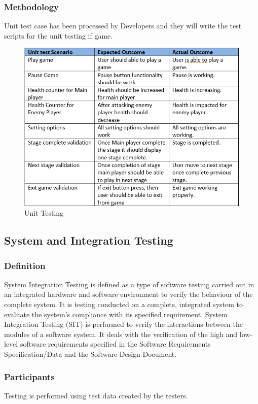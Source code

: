 \documentclass{article}
\begin{document}
\subsubsection{Methodology}
Unit test case has been processed by Developers and they will write the test scripts for the unit testing if game.\cite{UT}
\begin{figure}[h!]
    \centering
    \includegraphics[scale=0.6]{./images/unittesting.PNG}
    \caption{Unit Testing}
    \label{fig:my_label}
\end{figure}

\newpage

\subsection{System and Integration Testing}
\subsubsection{Definition}
System Integration Testing is defined as a type of software testing carried out in an integrated hardware and software environment to verify the behaviour of the complete system. It is testing conducted on a complete, integrated system to evaluate the system's compliance with its specified requirement.
System Integration Testing (SIT) is performed to verify the interactions between the modules of a software system. It deals with the verification of the high and low-level software requirements specified in the Software Requirements Specification/Data and the Software Design Document.\cite{SIT}

\subsubsection{Participants}
Testing is performed using test data created by the testers.
\end{document}
